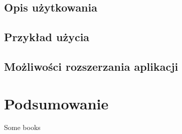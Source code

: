 \documentclass[12pt]{report}
\let\Oldsection\section
\renewcommand{\section}{\FloatBarrier\Oldsection}
\begin{document}
\section{Opis użytkowania}
\section{Przykład użycia}
\section{Możliwości rozszerzania aplikacji}
\chapter{Podsumowanie}

\begin{thebibliography}{99}
	 {Some books}
\end{thebibliography}

\listoffigures

\listoftables
\end{document}
